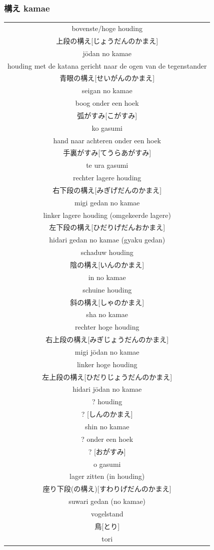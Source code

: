\documentclass[a4paper, 12pt]{article}
\begin{document}
\begin{CJK}{UTF8}{min}
\subsubsection{構え kamae}
\begin{table}[H]
\begin{center}
\begin{tabular}{c}
bovenste/hoge houding\\
上段の構え[じょうだんのかまえ]\\
j\={o}dan no kamae\\
\hline
houding met de katana gericht naar de ogen van de tegenstander\\
青眼の構え[せいがんのかまえ]\\
seigan no kamae\\
\hline
boog onder een hoek\\
弧がすみ[こがすみ]\\
ko gasumi\\
\hline
hand naar achteren onder een hoek\\
手裏がすみ[てうらあがすみ]\\
te ura gasumi\\
\hline
rechter lagere houding\\
右下段の構え[みぎげだんのかまえ]\\
migi gedan no kamae\\
\hline
linker lagere houding (omgekeerde lagere)\\
左下段の構え[ひだりげだんおかまえ]\\
hidari gedan no kamae (gyaku gedan)\\
\hline
schaduw houding\\
陰の構え[いんのかまえ]\\
in no kamae\\
\hline
schuine houding\\
斜の構え[しゃのかまえ]\\
sha no kamae\\
\hline
rechter hoge houding\\
右上段の構え[みぎじょうだんのかまえ]\\
migi j\={o}dan no kamae\\
\hline
linker hoge houding\\
左上段の構え[ひだりじょうだんのかまえ]\\
hidari j\={o}dan no kamae\\
\hline
? houding\\
? [しんのかまえ]\\
shin no kamae\\
\hline
? onder een hoek\\
? [おがすみ]\\
o gasumi\\
\hline
lager zitten (in houding)\\
座り下段(の構え)[すわりげだんのかまえ]\\
suwari gedan (no kamae)\\
\hline
vogelstand\\
鳥[とり]\\
tori
\end{tabular}
\end{center}
\label{kyuu_6_katori_kamae}
\end{table}


\end{CJK}
\end{document}
